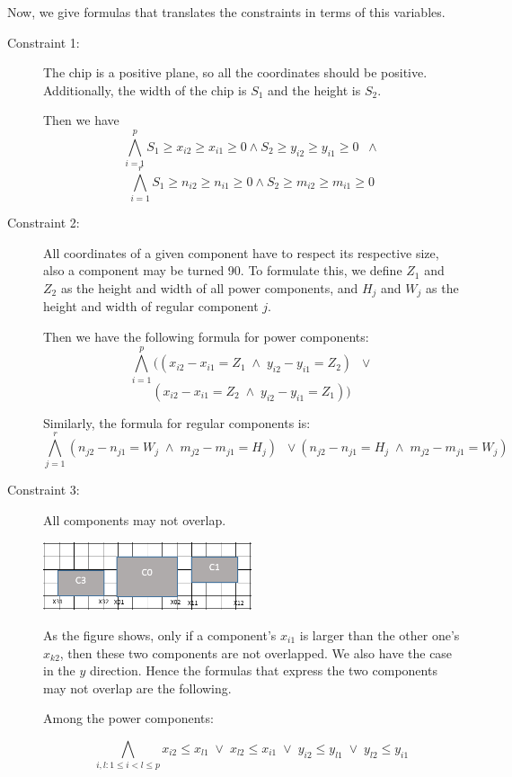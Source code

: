 Now, we give formulas that translates the constraints in terms of this variables.

\begin{description}
  \item[Constraint 1:] The chip is a positive plane, so all the coordinates should be positive. Additionally, the width of the chip is $S_1$ and the height is $S_2$.

  Then we have
  \[  \bigwedge_{i=1}^p S_1 \geq x_{i2} \geq x_{i1} \geq 0 \wedge S_2 \geq y_{i2} \geq y_{i1} \geq 0 \;\; \wedge \]
  \[  \bigwedge_{i=1}^r S_1 \geq n_{i2} \geq n_{i1} \geq 0 \wedge S_2 \geq m_{i2} \geq m_{i1} \geq 0 \]
  

  \item[Constraint 2:] All coordinates of a given component have to respect its respective size, also a component may be turned 90. To formulate this, we define $Z_1$ and $Z_2$ as the height and width of all power components, and $H_{j}$ and $W_{j}$ as the height and width of regular component $j$.

  Then we have the following formula for power components:
  \[  \bigwedge_{i=1}^p ((x_{i2} - x_{i1} = Z_1 \; \wedge \; y_{i2} - y_{i1} = Z_2) \;\; \vee \]
  \[ (x_{i2} - x_{i1} = Z_2 \; \wedge \; y_{i2} - y_{i1} = Z_1)) \]

  Similarly, the formula for regular components is:
  \[  \bigwedge_{j=1}^r (n_{j2} - n_{j1} = W_j \; \wedge \; m_{j2} - m_{j1} = H_j) \;\; \vee (n_{j2} - n_{j1} = H_j \; \wedge \; m_{j2} - m_{j1} = W_j) \]
  
  
  \item[Constraint 3:] All components may not overlap.

\begin{center}
\includegraphics[width=0.5\textwidth]{Part1_2_1.png}
\end{center}
  As the figure shows, only if a component's $x_{i1}$ is larger than the other one's $x_{k2}$, then these two components are not overlapped. We also have the case in the $y$ direction. Hence the formulas that express the two components may not overlap are the following.

  Among the power components:

  \[  \bigwedge_{i,l: 1 \leq i < l \leq p}
  x_{i2} \leq x_{l1} \; \vee \; x_{l2} \leq x_{i1} \; \vee \; y_{i2} \leq y_{l1} \; \vee \; y_{l2} \leq y_{i1} \]


\end{description}
